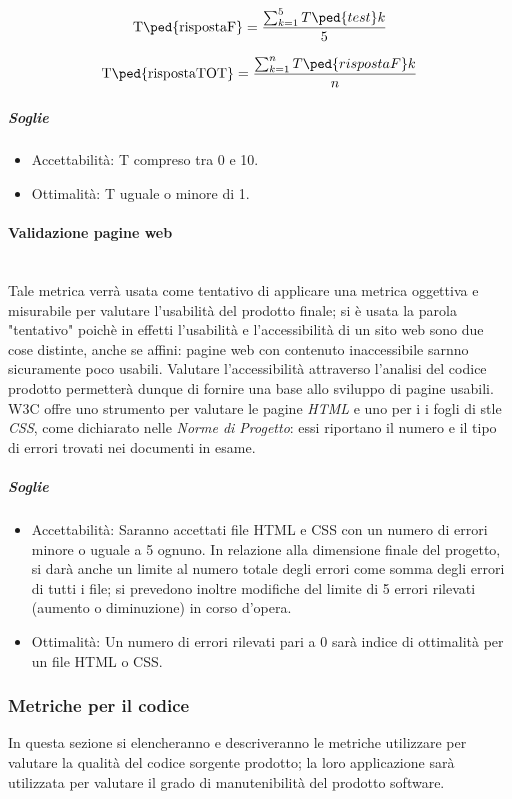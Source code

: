 	\begin{displaymath}
		\mbox{T\ped{rispostaF}} =\frac{\sum_{k=1}^5 T\ped{test}k}{5}
	\end{displaymath}
	
	\begin{displaymath}
		\mbox{T\ped{rispostaTOT}} =\frac{\sum_{k=1}^n T\ped{rispostaF}k}{n}
	\end{displaymath}
	
	\subparagraph{Soglie}
	\begin{itemize}
	\item Accettabilità: T compreso tra 0 e 10.
	\item Ottimalità: T uguale o minore di 1.
	\end{itemize}
	 
\paragraph{Validazione pagine web}
	~\\Tale metrica verrà usata come tentativo di applicare una metrica oggettiva e misurabile per valutare l'usabilità del prodotto finale; si è usata la parola "tentativo" poichè in effetti l'usabilità e l'accessibilità di un sito web sono due cose distinte, anche se affini: pagine web con contenuto inaccessibile sarnno sicuramente poco usabili. Valutare l'accessibilità attraverso l'analisi del codice prodotto permetterà dunque di fornire una base allo sviluppo di pagine usabili.
W3C offre uno strumento per valutare le pagine \emph{HTML} e uno per i i fogli di stle \emph{CSS}, come dichiarato nelle \emph{Norme di Progetto}: essi riportano il numero e il tipo di errori trovati nei documenti in esame.

\subparagraph{Soglie}
	\begin{itemize}
	\item Accettabilità: Saranno accettati file HTML e CSS con un numero di errori minore o uguale a 5 ognuno. In relazione alla dimensione finale del progetto, si darà anche un limite al numero totale degli errori come somma degli errori di tutti i file; si prevedono inoltre modifiche del limite di 5 errori rilevati (aumento o diminuzione) in corso d'opera.
	\item Ottimalità: Un numero di errori rilevati pari a 0 sarà indice di ottimalità per un file HTML o CSS.
	\end{itemize}
	
\pagebreak
\subsubsection{Metriche per il codice}
In questa sezione si elencheranno e descriveranno le metriche utilizzare per valutare la qualità del codice sorgente prodotto; la loro applicazione sarà utilizzata per valutare il grado di manutenibilità del prodotto software.

